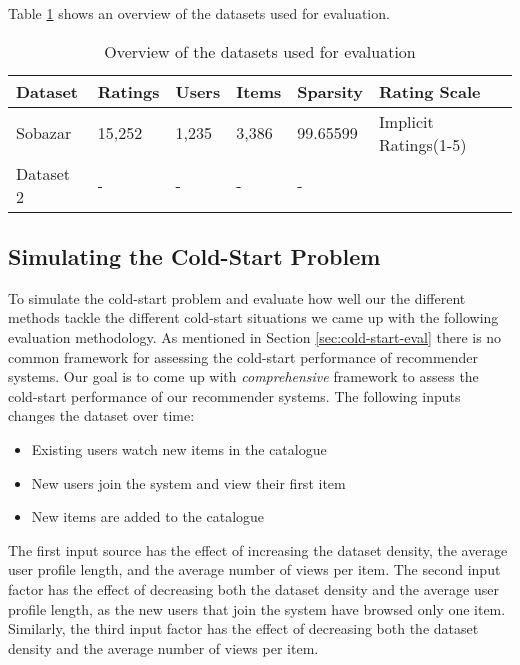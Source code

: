 Table \ref{table:datasets} shows an overview of the datasets used for evaluation.


\begin{table}[H]
    \centering
    \begin{tabular}{|l|l|l|l|l|l|}
    \hline
	Dataset			& 	Ratings 	& 	Users	& 	Items 	& 	Sparsity	& Rating Scale 				\\ \hline
	Sobazar 		& 	15,252  	& 	1,235	&	3,386	&	99.65599	& Implicit Ratings(1-5)		\\ \hline
	Dataset 2 		& 	-  			& 	-		&	-		&	-			&							\\ \hline
    \end{tabular}
    \label{table:datasets}
    \caption [Overview of the datasets used for evaluation]{Overview of the datasets used for evaluation}
\end{table}


\subsection{Simulating the Cold-Start Problem}

To simulate the cold-start problem and evaluate how well our the different methods tackle the different cold-start situations we came up with the following evaluation methodology. As mentioned in Section \ref{sec:cold-start-eval} there is no common framework for assessing the cold-start performance of recommender systems. Our goal is to come up with \emph{comprehensive} framework to assess the cold-start performance of our recommender systems. The following inputs changes the dataset over time:

\begin{itemize}
	\item Existing users watch new items in the catalogue
	\item	New users join the system and view their first item
	\item	New items are added to the catalogue
\end{itemize}

The first input source has the effect of increasing the dataset density, the average user profile length, and the 
average number of views per item. The second input factor has the effect of decreasing both the dataset density 
and the average user profile length, as the new users that join the system have browsed only one item. Similarly, 
the third input factor has the effect of decreasing both the dataset density and the average number of views per 
item.

